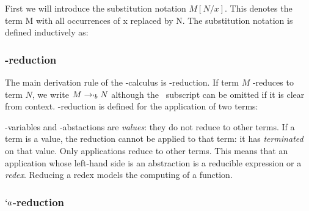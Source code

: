   First we will introduce the substitution notation $M[N/x]$. This denotes 
  the term M with all occurrences of x replaced by N. The substitution 
  notation is defined inductively as:
   
    \begin{figure}[!h]
    \end{figure}

\subsubsection{\bta-reduction}
  The main derivation rule of the \lam-calculus is \bta-reduction. If term
  $M$ \bta-reduces to term $N$, we write $M \rightarrow_{`b} N$ although 
  the \bta\ subscript can be omitted if it is clear from context. \bta-reduction
  is defined for the application of two terms:
  \begin{figure}[!h]\label{def:beta-reduction}
  \end{figure}
 
  \lam-variables and \lam-abstactions are \emph{values}: they do not reduce to other terms. 
  If a term is a value, the reduction cannot be applied to that term: it has \emph{terminated} on that value. 
  Only applications reduce to other terms. 
  This means that an application whose left-hand side is an abstraction is a reducible expression or a \emph{redex}. 
  Reducing a redex models the computing of a function. 

\subsubsection{$`a$-reduction}
 
